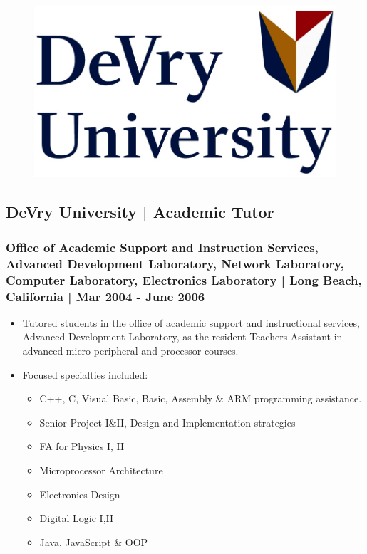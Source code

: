 \documentclass[letter,10pt]{article}
\begin{document}
\begin{figure}
\includegraphics[width=0.8\linewidth]{./img/50p_cr_devry.jpg}
\end{figure}

\subsection*{DeVry University | Academic Tutor}
\label{sec:orgf8f6f83}
\subsubsection*{Office of Academic Support and Instruction Services, Advanced Development Laboratory, Network Laboratory, Computer Laboratory, Electronics Laboratory | Long Beach, California | Mar 2004 - June 2006}
\label{sec:orgcbddf62}
\begin{itemize}
\item Tutored students in the office of academic support and instructional services, Advanced Development Laboratory, as the resident Teachers Assistant in advanced micro peripheral and processor courses.
\item Focused specialties included:
\begin{itemize}
\item C++, C, Visual Basic, Basic, Assembly \& ARM programming assistance.
\item Senior Project I\&II, Design and Implementation strategies
\item FA for Physics I, II
\item Microprocessor Architecture
\item Electronics Design
\item Digital Logic I,II
\item Java, JavaScript \& OOP
\end{itemize}
\end{itemize}
\end{document}

